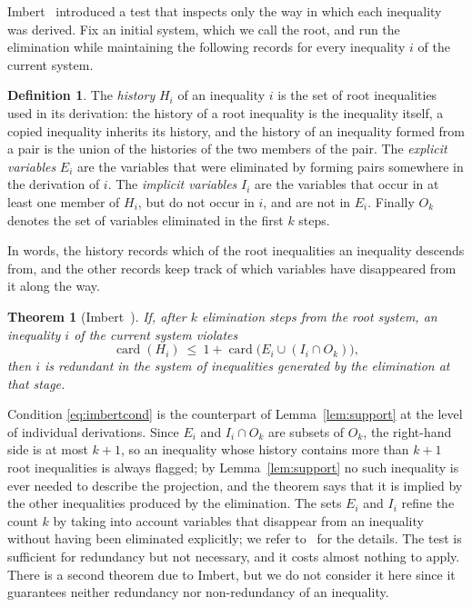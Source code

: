\documentclass[11pt]{article}
\newtheorem{theorem}{Theorem}
\theoremstyle{definition}
\newtheorem{definition}{Definition}
\newcommand{\card}{\operatorname{card}}
\begin{document}
Imbert~\cite{imbert1990,imbert1993} introduced a test that inspects only the way in which each inequality was derived. Fix an initial system, which we call the root, and run the elimination while maintaining the following records for every inequality $i$ of the current system.

\begin{definition}
\label{def:imbert}
The \emph{history} $H_i$ of an inequality $i$ is the set of root inequalities used in its derivation: the history of a root inequality is the inequality itself, a copied inequality inherits its history, and the history of an inequality formed from a pair is the union of the histories of the two members of the pair. The \emph{explicit variables} $E_i$ are the variables that were eliminated by forming pairs somewhere in the derivation of $i$. The \emph{implicit variables} $I_i$ are the variables that occur in at least one member of $H_i$, but do not occur in $i$, and are not in $E_i$. Finally $O_k$ denotes the set of variables eliminated in the first $k$ steps.
\end{definition}

In words, the history records which of the root inequalities an inequality descends from, and the other records keep track of which variables have disappeared from it along the way.

\begin{theorem}[Imbert~\cite{imbert1990,imbert1993}]
\label{thm:imbert}
If, after $k$ elimination steps from the root system, an inequality $i$ of the current system violates
\begin{equation}
\card(H_i)\ \le\ 1+\card\!\big(E_i\cup(I_i\cap O_k)\big),
\label{eq:imbertcond}
\end{equation}
then $i$ is redundant in the system of inequalities generated by the elimination at that stage.
\end{theorem}

Condition \eqref{eq:imbertcond} is the counterpart of Lemma~\ref{lem:support} at the level of individual derivations. Since $E_i$ and $I_i\cap O_k$ are subsets of $O_k$, the right-hand side is at most $k+1$, so an inequality whose history contains more than $k+1$ root inequalities is always flagged; by Lemma~\ref{lem:support} no such inequality is ever needed to describe the projection, and the theorem says that it is implied by the other inequalities produced by the elimination. The sets $E_i$ and $I_i$ refine the count $k$ by taking into account variables that disappear from an inequality without having been eliminated explicitly; we refer to~\cite{imbert1990} for the details. The test is sufficient for redundancy but not necessary, and it costs almost nothing to apply. There is a second theorem due to Imbert, but we do not consider it here since it guarantees neither redundancy nor non-redundancy of an inequality.
\end{document}
